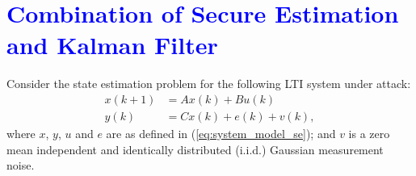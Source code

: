 \documentclass[12pt, conference, a4paper, twoside]{IEEEconf_mod}
\begin{document}
%
%



\vspace{3mm}
\section{\textcolor{blue}{Combination of Secure Estimation and Kalman Filter}}\label{sec:estimation}
Consider the state estimation problem for the following LTI system under attack:
\begin{equation}
\begin{aligned}
x(k+1) & = A x(k) + B u(k)\\
y(k) & = C x(k) + e(k) + v(k),
\end{aligned}
\end{equation}
where $x$, $y$, $u$ and $e$ are as defined in (\ref{eq:system_model_se});
and $v$ is a zero mean independent and identically distributed (i.i.d.) Gaussian measurement noise. 
\end{document}
